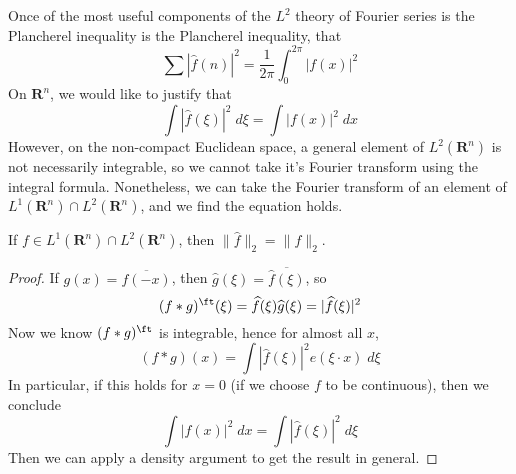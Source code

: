 Once of the most useful components of the $L^2$ theory of Fourier series is the Plancherel inequality is the Plancherel inequality, that
%
\[ \sum |\widehat{f}(n)|^2 = \frac{1}{2\pi} \int_0^{2\pi} |f(x)|^2 \]
%
On $\mathbf{R}^n$, we would like to justify that
%
\[ \int |\widehat{f}(\xi)|^2\; d\xi = \int |f(x)|^2\; dx \]
%
However, on the non-compact Euclidean space, a general element of $L^2(\mathbf{R}^n)$ is not necessarily integrable, so we cannot take it's Fourier transform using the integral formula. Nonetheless, we can take the Fourier transform of an element of $L^1(\mathbf{R}^n) \cap L^2(\mathbf{R}^n)$, and we find the equation holds.

\begin{theorem}
	If $f \in L^1(\mathbf{R}^n) \cap L^2(\mathbf{R}^n)$, then $\| \widehat{f} \|_2 = \| f \|_2$.
\end{theorem}
\begin{proof}
	If $g(x) = \overline{f(-x)}$, then $\widehat{g}(\xi) = \overline{\widehat{f}(\xi)}$, so
	\[ (f * g)^\ft(\xi) = \widehat{f}(\xi) \widehat{g}(\xi) = |\widehat{f}(\xi)|^2 \]
	Now we know $(f * g)^\ft$ is integrable, hence for almost all $x$,
	\[ (f * g)(x) = \int |\widehat{f}(\xi)|^2 e(\xi \cdot x)\; d\xi \]
	In particular, if this holds for $x = 0$ (if we choose $f$ to be continuous), then we conclude
	\[ \int |f(x)|^2\; dx = \int |\widehat{f}(\xi)|^2\; d\xi \]
	Then we can apply a density argument to get the result in general.
\end{proof}

